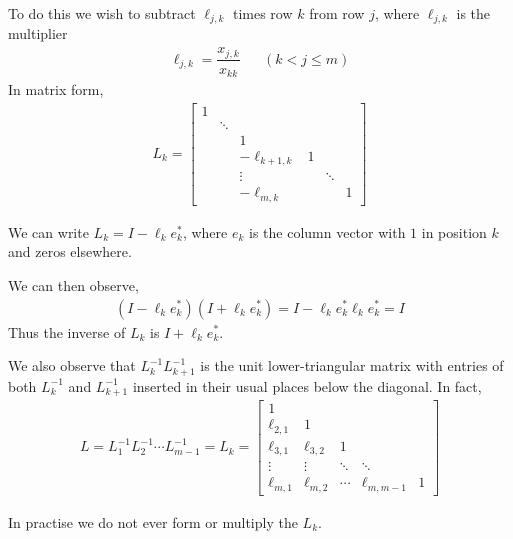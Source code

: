 \documentclass[12pt]{article}
\begin{document}
To do this we wish to subtract \( \ell_{j,k} \) times row \( k \) from row \( j \), where \( \ell_{j,k} \) is the multiplier
\begin{align*}
    \ell_{j,k} = \dfrac{x_{j,k}}{x_{kk}} && (k<j\leq m)
\end{align*}
In matrix form,
\begin{align*}
    L_k = \left[\begin{array}{cccccc}
    1 \\
    & \ddots \\
    && 1 \\
    && -\ell_{k+1,k} & 1 \\
    &&\vdots && \ddots \\
    &&-\ell_{m,k} &&& 1
    \end{array}\right]
\end{align*}

We can write \( L_k = I - \ell_k e^*_k \), where \( e_k \) is the column vector with \( 1 \) in position \( k \) and zeros elsewhere.

We can then observe,
\begin{align*}
    (I-\ell_ke_k^*)(I+\ell_ke_k^*) = I - \ell_k e_k^*\ell_k e_k^* = I
\end{align*}
Thus the inverse of \( L_k \) is \( I + \ell_ke_k^* \).

We also observe that \( L_k^{-1}L_{k+1}^{-1} \) is the unit lower-triangular matrix with entries of both \( L_k^{-1} \) and \( L_{k+1}^{-1} \) inserted in their usual places below the diagonal. In fact,
\begin{align*}
    L = L_1^{-1}L_2^{-1} \cdots L_{m-1}^{-1} =
    L_k = \left[\begin{array}{cccccc}
    1 \\
    \ell_{2,1} & 1 \\
    \ell_{3,1} & \ell_{3,2} & 1 \\
    \vdots & \vdots & \ddots & \ddots \\
    \ell_{m,1} & \ell_{m,2} & \cdots & \ell_{m,m-1} & 1
    \end{array}\right]
\end{align*}

In practise we do not ever form or multiply the \( L_k \).

\begin{algorithm}
\begin{algorithmic}
    \EndFor
\EndFor
\end{algorithmic}
\end{algorithm}
\end{document}
